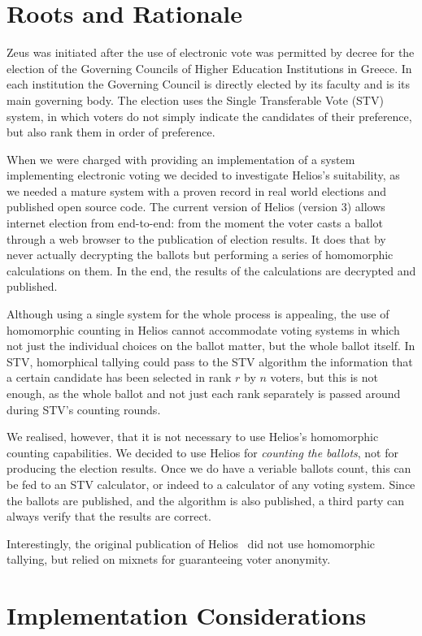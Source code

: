 \documentclass[runningheads,a4paper]{llncs}
\begin{document}
\section{Roots and Rationale}

Zeus was initiated after the use of electronic vote was permitted by
decree for the election of the Governing Councils of Higher Education
Institutions in Greece. In each institution the Governing Council is
directly elected by its faculty and is its main governing body. The
election uses the Single Transferable Vote (STV) system, in which
voters do not simply indicate the candidates of their preference, but
also rank them in order of preference. 

When we were charged with providing an implementation of a system
implementing electronic voting we decided to investigate Helios's
suitability, as we needed a mature system with a proven record in real
world elections and published open source code. The current version of
Helios (version 3) allows internet election from end-to-end: from the
moment the voter casts a ballot through a web browser to the
publication of election results. It does that by never actually
decrypting the ballots but performing a series of homomorphic
calculations on them. In the end, the results of the calculations are
decrypted and published. 

Although using a single system for the whole process is appealing, the
use of homomorphic counting in Helios cannot accommodate voting
systems in which not just the individual choices on the ballot matter,
but the whole ballot itself. In STV, homorphical tallying could pass
to the STV algorithm the information that a certain candidate has been
selected in rank $r$ by $n$ voters, but this is not enough, as the whole
ballot and not just each rank separately is passed around during STV's
counting rounds.

We realised, however, that it is not necessary to use Helios's
homomorphic counting capabilities. We decided to use Helios for
\emph{counting the ballots}, not for producing the election results.
Once we do have a veriable ballots count, this can be fed to an STV
calculator, or indeed to a calculator of any voting system. Since the
ballots are published, and the algorithm is also published, a third
party can always verify that the results are correct.

Interestingly, the original publication of Helios~\cite{adida:2008}
did not use homomorphic tallying, but relied on mixnets for
guaranteeing voter anonymity. 

\section{Implementation Considerations}



\end{document}

